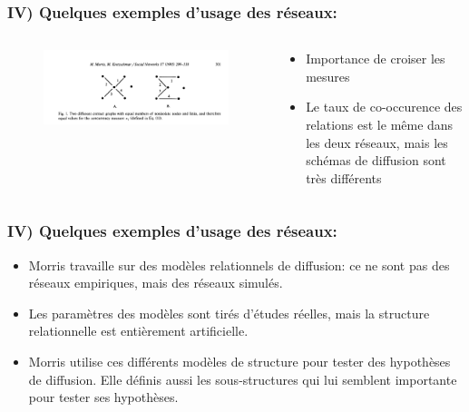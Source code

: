 \documentclass{beamer}
\begin{document}
\begin{frame}
    \frametitle{IV) Quelques exemples d'usage des réseaux:}
    \begin{columns}
        \begin{column}{0.5\textwidth}
            \begin{figure}
                \centering
                \includegraphics[width = \textwidth]{Morris.png}
            \end{figure}
        \end{column}
        \begin{column}{0.5\textwidth}
            \begin{itemize}
                \item Importance de croiser les mesures
                \item Le taux de co-occurence des relations est le même dans les deux réseaux, mais les schémas de diffusion sont très différents
            \end{itemize}
        \end{column}
    \end{columns}
\end{frame}

\begin{frame}
    \frametitle{IV) Quelques exemples d'usage des réseaux:}
    \begin{itemize}
        \item Morris travaille sur des modèles relationnels de diffusion: ce ne sont pas des réseaux empiriques, mais des réseaux simulés.
        \item Les paramètres des modèles sont tirés d'études réelles, mais la structure relationnelle est entièrement artificielle.
        \item Morris utilise ces différents modèles de structure pour tester des hypothèses de diffusion. Elle définis aussi les sous-structures qui lui semblent importante pour tester ses hypothèses.
    \end{itemize}
\end{frame}
\end{document}

